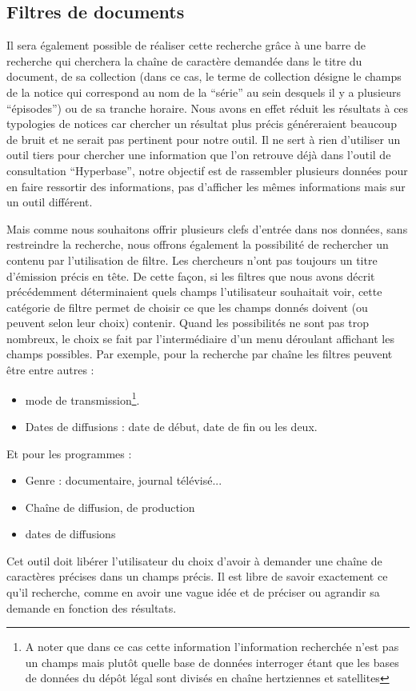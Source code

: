 \subsection{Filtres de documents}

Il sera également possible de réaliser cette recherche grâce à une barre de recherche qui cherchera la chaîne de caractère demandée dans le titre du document, de sa collection (dans ce cas, le terme de collection désigne le champs de la notice qui correspond au nom de la \enquote{série} au sein desquels il y a plusieurs \enquote{épisodes}) ou de sa tranche horaire. Nous avons en effet réduit les résultats à ces typologies de notices car chercher un résultat plus précis généreraient beaucoup de bruit et ne serait pas pertinent pour notre outil. Il ne sert à rien d'utiliser un outil tiers pour chercher une information que l'on retrouve déjà dans l'outil de consultation \enquote{Hyperbase}, notre objectif est de rassembler plusieurs données pour en faire ressortir des informations, pas d'afficher les mêmes informations mais sur un outil différent. 

Mais comme nous souhaitons offrir plusieurs clefs d'entrée dans nos données, sans restreindre la recherche, nous offrons également la possibilité de rechercher un contenu par l'utilisation de filtre. Les chercheurs n'ont pas toujours un titre d'émission précis en tête. De cette façon, si les filtres que nous avons décrit précédemment déterminaient quels champs l'utilisateur souhaitait voir, cette catégorie de filtre permet de choisir ce que les champs donnés doivent (ou peuvent selon leur choix) contenir. Quand les possibilités ne sont pas trop nombreux, le choix se fait par l'intermédiaire d'un menu déroulant affichant les champs possibles. Par exemple, pour la recherche par chaîne les filtres peuvent être entre autres : 
\begin{itemize}
	\item mode de transmission\footnote{A noter que dans ce cas cette information l'information recherchée n'est pas un champs mais plutôt quelle base de données interroger étant que les bases de données du dépôt légal sont divisés en chaîne hertziennes et satellites}. 
	\item Dates de diffusions : date de début, date de fin ou les deux.
\end{itemize}
Et pour les programmes : 
\begin{itemize}
	\item Genre : documentaire, journal télévisé...
	\item Chaîne de diffusion, de production 
	\item dates de diffusions
\end{itemize}
Cet outil doit libérer l'utilisateur du choix d'avoir à demander une chaîne de caractères précises dans un champs précis. Il est libre de savoir exactement ce qu'il recherche, comme en avoir une vague idée et de préciser ou agrandir sa demande en fonction des résultats. 